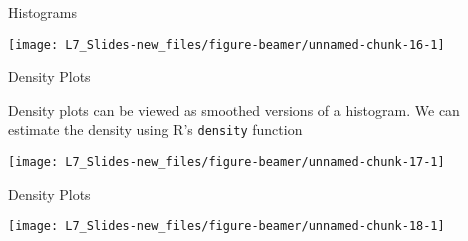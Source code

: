 \documentclass[ignorenonframetext,]{beamer}
\newenvironment{Shaded}{\begin{snugshade}}{\end{snugshade}}
\newcommand{\KeywordTok}[1]{\textcolor{white}{\textbf{{#1}}}}
\newcommand{\NormalTok}[1]{\textcolor{yellow}{{#1}}}
\newcommand{\DataTypeTok}[1]{\textcolor{yellow}{{#1}}}
\newcommand{\StringTok}[1]{\textcolor{yellow}{{#1}}}
\begin{document}
\begin{frame}{Histograms}

\small

\begin{center}\texttt{[image: L7\_Slides-new\_files/figure-beamer/unnamed-chunk-16-1]} \end{center}

\end{frame}

\begin{frame}[fragile]{Density Plots}

Density plots can be viewed as smoothed versions of a histogram. We can
estimate the density using R's \texttt{density} function

\small

\begin{Shaded}
\end{Shaded}

\begin{center}\texttt{[image: L7\_Slides-new\_files/figure-beamer/unnamed-chunk-17-1]} \end{center}

\end{frame}

\begin{frame}[fragile]{Density Plots}

\small

\begin{Shaded}
\end{Shaded}

\begin{center}\texttt{[image: L7\_Slides-new\_files/figure-beamer/unnamed-chunk-18-1]} \end{center}

\end{frame}
\end{document}
